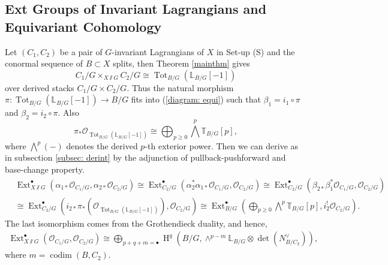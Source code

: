 \documentclass[12pt]{amsart}
\theoremstyle{definition}
\theoremstyle{remark}
\numberwithin{equation}{section}
\newcommand{\LL}{\mathbb{L}}
\newcommand{\TT}{\mathbb{T}}
\newcommand{\shO}{\mathcal{O}}
\newcommand{\codim}{\operatorname{codim}}
\newcommand{\Ext}{\operatorname{Ext}}
\newcommand{\Tot}{\operatorname{Tot}}
\newcommand{\arw}{\longrightarrow}
\newcommand{\Hdot}{\operatorname{H}}
\begin{document}
\subsection{Ext Groups of Invariant Lagrangians and Equivariant Cohomology}
Let $(C_1, C_2)$ be a pair of $G$-invariant Lagrangians of $X$ in Set-up (S) and  the conormal sequence of $B\subset X$ splits, then
Theorem \ref{mainthm} gives 
$$C_1/G\times_{X\sslash  G} C_2/G\cong \Tot_{B/G}(\LL_{B/G}[-1])$$
over derived stacks $C_1/G\times C_2/G$. Thus the natural morphism $\pi: \Tot_{B/G}(\LL_{B/G}[-1])\arw B/G$ fits into  (\ref{diagram: equi}) such that $\beta_1=i_1\circ \pi$ and $\beta_2=i_2\circ \pi$. Also
$$\pi_*\shO_{\Tot_{B/G}(\LL_{B/G}[-1])}\cong \bigoplus_{p\geq 0}\bigwedge^p \TT_{B/G}[p],$$
where $\bigwedge^p(-)$ denotes the derived $p$-th exterior power.
Then we can derive as in subsection \ref{subsec: derint} by the adjunction of pullback-pushforward and base-change property. 
\begin{align*}
    &\Ext_{X\sslash G}^{\bullet}(\alpha_{1*}\shO_{C_1/G}, \alpha_{2*}\shO_{C_2/G})\cong \Ext_{C_2/G}^{\bullet}(\alpha_2^{*}\alpha_{1*}\shO_{C_1/G}, \shO_{C_2/G})
    \cong \Ext_{C_2/G}^{\bullet}(\beta_{2*}\beta_1^{*}\shO_{C_1/G}, \shO_{C_2/G})\\
    &\cong \Ext_{C_2/G}^{\bullet}(i_{2*}\pi_*(\shO_{\Tot_{B/G}(\LL_{B/G}[-1])}), \shO_{C_2/G})\cong \Ext_{B/G}^{\bullet}(\bigoplus_{p\geq 0}\bigwedge^p\TT_{B/G}[p], i_2^{!}\shO_{C_2/G}).
\end{align*}
The last isomorphism comes from the Grothendieck duality,
and hence, 
\begin{align}
    \Ext^{\bullet}_{X\sslash  G}(\shO_{C_1/G},\shO_{C_2/G})\cong\bigoplus_{p+q+m=\bullet}
\Hdot^q(B/G, \wedge^{p-m}\LL_{B/G}\otimes \det(N_{B/C_2}^{\vee})),
\end{align}
where $m=\codim(B, C_2)$.
\end{document}

